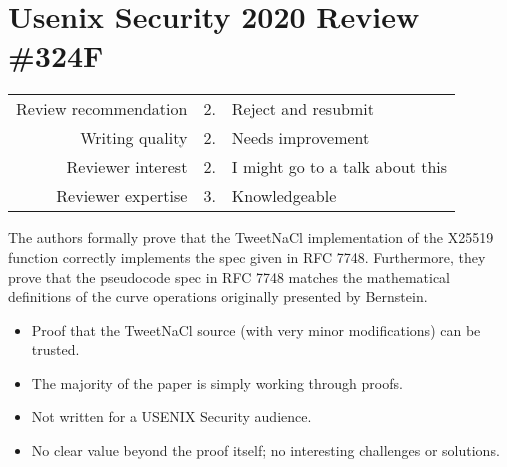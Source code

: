 \newpage
\section*{Usenix Security 2020 Review \#324F}

\begin{tabular}{rrp{}}
    \toprule
    Review recommendation & 2. & Reject and resubmit             \\
    Writing quality       & 2. & Needs improvement               \\
    Reviewer interest     & 2. & I might go to a talk about this \\
    Reviewer expertise    & 3. & Knowledgeable                   \\
    \bottomrule
\end{tabular}

\begin{center}
\end{center}

The authors formally prove that the TweetNaCl implementation of the X25519
function correctly implements the spec given in RFC 7748. Furthermore, they
prove that the pseudocode spec in RFC 7748 matches the mathematical definitions
of the curve operations originally presented by Bernstein.

\begin{center}
\end{center}
\begin{itemize}
    \item Proof that the TweetNaCl source (with very minor modifications) can be trusted.
\end{itemize}

\begin{center}
\end{center}

\begin{itemize}
    \item The majority of the paper is simply working through proofs.
    \item Not written for a USENIX Security audience.
    \item No clear value beyond the proof itself; no interesting challenges or solutions.
\end{itemize}

\begin{center}
\end{center}

